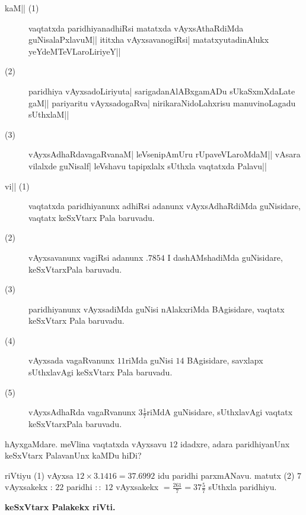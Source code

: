 \begin{description}
\item[\textmd{kaM||} \rm(1)] vaqtatxda paridhiyanadhiRsi matatxda
vAyxsAthaRdiMda guNisalaPxlavuM|| ititxha vAyxsavanogiRsi|
matatxyutadi\-nAlukx yeYdeMTeVLaroLiriyeY||

\item[\rm(2)] paridhiya vAyxsadoLiriyuta| sarigadanAlABxgamADu
sUkaSxmXdaLate gaM|| pariyaritu vAyxsadogaRva| nirikaraNi\-doLahxrisu
manuvinoLagadu sUthxlaM||

\item[\rm(3)] vAyxsAdhaRdavagaRvanaM| leVsenipAmUru rUpaveVLaroMdaM||
vAsara vilalxde guNisalf| leVshavu tapipxlalx sUthxla vaqtatxda
Palavu||
\end{description}

\begin{description}
\item[\textmd{vi||} \rm(1)] 
vaqtatxda paridhiyanunx adhiRsi adanunx vAyxsAdhaRdiMda guNisidare,
vaqtatx keSxVtarx Pala baruvadu.

\item[\rm(2)] vAyxsavanunx vagiRsi adanunx $.7854$ I dashAMshadiMda
guNisidare, keSxVtarxPala baruvadu.

\item[\rm(3)] paridhiyanunx vAyxsadiMda guNisi nAlakxriMda BAgisidare,
vaqtatx keSxVtarx Pala baruvadu.

\item[\rm(4)] vAyxsada vagaRvanunx $11$riMda guNisi $14$ BAgisidare,
savxlapx sUthxlavAgi keSxVtarx Pala baruvadu.

\item[\rm(5)] vAyxsAdhaRda vagaRvanunx $3\frac{1}{7}$riMdA guNisidare,
sUthxlavAgi vaqtatx keSxVtarxPala baruvadu.
\end{description}

hAyxgaMdare. meVlina vaqtatxda vAyxsavu $12$ idadxre, adara
paridhiyanUnx keSxVtarx PalavanUnx kaMDu hiDi?

\medskip

riVtiyu {\rm(1)} vAyxsa $12\times 3.1416=37.6992$ idu paridhi
parxmANavu. matutx {\rm(2)} $7$ vAyxsakekx : $22$ paridhi $::\;12$
vAyxsakekx $=\frac{261}{7}=37\frac{5}{7}$ sUthxla paridhiyu.

\medskip
\begin{center}
{\bf keSxVtarx Palakekx riVti.}
\end{center}

